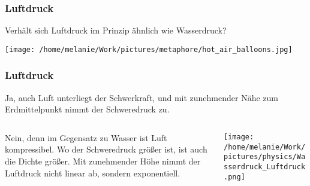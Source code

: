 \documentclass{beamer}
\begin{document}
\begin{frame}
\end{frame}



\begin{frame}
\end{frame}

\begin{frame}
\end{frame}

\begin{frame}
\end{frame}



\begin{frame}
\frametitle{Luftdruck}

Verhält sich Luftdruck im Prinzip ähnlich wie Wasserdruck? 

\begin{center}
\texttt{[image: /home/melanie/Work/pictures/metaphore/hot\_air\_balloons.jpg]}
\end{center}


\end{frame}

\begin{frame}
\frametitle{Luftdruck}

\textcolor{theme}{Ja,} auch Luft unterliegt der Schwerkraft, und mit zunehmender Nähe zum Erdmittelpunkt nimmt der Schweredruck zu. 



\pause


\begin{columns}[c]

\begin{column}{5cm}
\textcolor{theme}{Nein,} denn im Gegensatz zu Wasser ist Luft kompressibel. Wo der Schweredruck größer ist, ist auch die Dichte größer. Mit zunehmender Höhe nimmt der Luftdruck nicht linear ab, sondern exponentiell. \\ 

\end{column}

\pause
\begin{column}{5cm}
\begin{center}
\texttt{[image: /home/melanie/Work/pictures/physics/Wasserdruck\_Luftdruck.png]}
\end{center}
\end{column}
\end{columns}

\end{frame}
\end{document}
